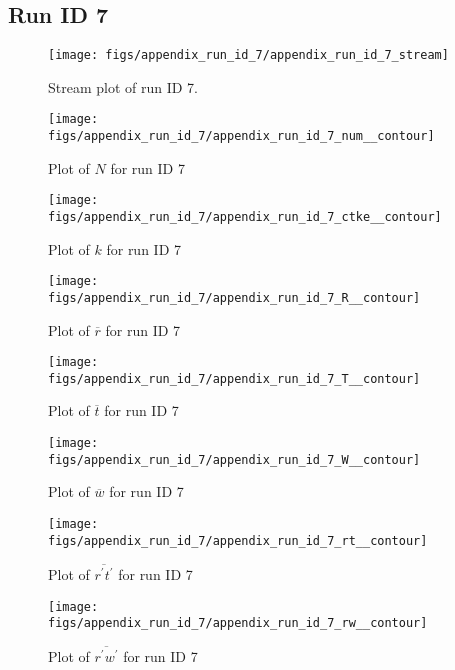 \subsection{Run ID 7}
\begin{figure}[H]
\centering
\texttt{[image: figs/appendix\_run\_id\_7/appendix\_run\_id\_7\_stream]}
\caption{Stream plot of run ID 7.}
\label{fig:appendix_run_id_7_stream}
\end{figure}


\begin{figure}[H]
\centering
\texttt{[image: figs/appendix\_run\_id\_7/appendix\_run\_id\_7\_num\_\_contour]}
\caption{Plot of $N$ for run ID 7}
\label{fig:appendix_run_id_7_num__contour}
\end{figure}


\begin{figure}[H]
\centering
\texttt{[image: figs/appendix\_run\_id\_7/appendix\_run\_id\_7\_ctke\_\_contour]}
\caption{Plot of $k$ for run ID 7}
\label{fig:appendix_run_id_7_ctke__contour}
\end{figure}


\begin{figure}[H]
\centering
\texttt{[image: figs/appendix\_run\_id\_7/appendix\_run\_id\_7\_R\_\_contour]}
\caption{Plot of $\overline{r}$ for run ID 7}
\label{fig:appendix_run_id_7_R__contour}
\end{figure}


\begin{figure}[H]
\centering
\texttt{[image: figs/appendix\_run\_id\_7/appendix\_run\_id\_7\_T\_\_contour]}
\caption{Plot of $\overline{t}$ for run ID 7}
\label{fig:appendix_run_id_7_T__contour}
\end{figure}


\begin{figure}[H]
\centering
\texttt{[image: figs/appendix\_run\_id\_7/appendix\_run\_id\_7\_W\_\_contour]}
\caption{Plot of $\overline{w}$ for run ID 7}
\label{fig:appendix_run_id_7_W__contour}
\end{figure}


\begin{figure}[H]
\centering
\texttt{[image: figs/appendix\_run\_id\_7/appendix\_run\_id\_7\_rt\_\_contour]}
\caption{Plot of $\overline{r^\prime t^\prime}$ for run ID 7}
\label{fig:appendix_run_id_7_rt__contour}
\end{figure}


\begin{figure}[H]
\centering
\texttt{[image: figs/appendix\_run\_id\_7/appendix\_run\_id\_7\_rw\_\_contour]}
\caption{Plot of $\overline{r^\prime w^\prime}$ for run ID 7}
\label{fig:appendix_run_id_7_rw__contour}
\end{figure}


